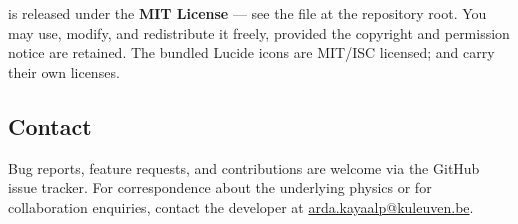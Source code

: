 \denis{} is released under the \textbf{MIT License} --- see the
 file at the repository root. You may use, modify, and
redistribute it freely, provided the copyright and permission notice
are retained. The bundled Lucide icons are MIT/ISC licensed;
 and  carry their own licenses.

\subsection{Contact}

Bug reports, feature requests, and contributions are welcome via the
GitHub issue tracker. For correspondence about the underlying
physics or for collaboration enquiries, contact the developer at
\href{mailto:arda.kayaalp@kuleuven.be}{arda.kayaalp@kuleuven.be}.
